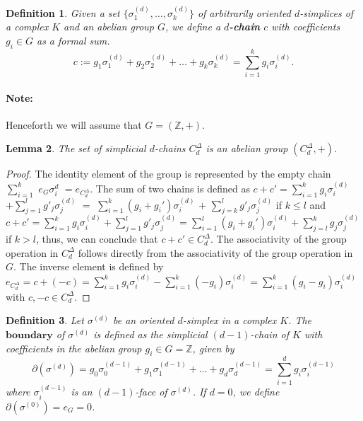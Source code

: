 \documentclass{amsart}
\newtheorem{definition}{Definition}[section]
\newtheorem{lemma}[definition]{Lemma}
\begin{document}
\begin{definition}
Given a set $\{\sigma_1^{(d)}, \ldots, \sigma_k^{(d)}\}$ of arbitrarily oriented $d$-simplices of a complex $K$ and an abelian group $G$, we define a \textbf{$d$-chain} $c$ with coefficients $g_i \in G$ as a formal sum.
\begin{equation}
c := g_1 \sigma^{(d)}_1 + g_2 \sigma^{(d)}_2 + \ldots + g_k \sigma^{(d)}_k = \sum_{i=1}^{k} g_i \sigma^{(d)}_i.
\end{equation}
\end{definition}

\paragraph{Note:} Henceforth we will assume that $G = (\mathbb{Z},+)$.

\begin{lemma}
The set of simplicial $d$-chains $C^\Delta_d$ is an abelian group $(C^\Delta_d,+)$.
\end{lemma}
\begin{proof}
The identity element of the group is represented by the empty chain $\sum_{i=1}^{k}$ $e_G \sigma^{d}_i$ $= e_{C_d^\Delta}$. The sum of two chains is defined as $c+c' = \sum_{i=1}^{k} g_i \sigma_i^{(d)}$ $+ \sum_{j=1}^{l} g'_j \sigma_j^{(d)}$ $=$ $\sum_{i=1}^{k} (g_i+g_i') \sigma_i^{(d)}$ $+$ $\sum_{j=k}^{l} g'_j \sigma_j^{(d)}$ if $k \leq l$ and $c+c' = \sum_{i=1}^{k} g_i \sigma_i^{(d)} + \sum_{j=1}^{l} g'_j \sigma_j^{(d)} = \sum_{i=1}^{l} (g_i+g_i') \sigma_i^{(d)} + \sum_{j=l}^{k} g_j \sigma_j^{(d)}$ if $k > l$, thus, we can conclude that $c+c' \in C^\Delta_d$. The associativity of the group operation in $C^\Delta_d$ follows directly from the associativity of the group operation in $G$. The inverse element is defined by $e_{C^\Delta_d} = c + (-c) = \sum_{i=1}^{k} g_i \sigma_i^{(d)} - \sum_{i=1}^{k} (-g_i) \sigma_i^{(d)} = \sum_{i=1}^{k} (g_i-g_i) \sigma_i^{(d)}$ with $c,-c \in C^\Delta_d$.
\end{proof}

\begin{definition}
Let $\sigma^{(d)}$ be an oriented $d$-simplex in a complex $K$. The $\textbf{boundary}$ of $\sigma^{(d)}$ is defined as the simplicial $(d-1)$-chain of $K$ with coefficients in the abelian group $g_i \in G = \mathbb{Z}$, given by
\begin{equation}
\partial(\sigma^{(d)}) = g_0 \sigma^{(d-1)}_0 + g_1 \sigma^{(d-1)}_1 + \ldots + g_d \sigma^{(d-1)}_d = \sum_{i=1}^{d} g_i \sigma^{(d-1)}_i
\end{equation}
where $\sigma^{(d-1)}_i$ is an $(d-1)$-face of $\sigma^{(d)}$. If $d=0$, we define $\partial(\sigma^{(0)}) = e_G = 0$.
\end{definition}
\end{document}
